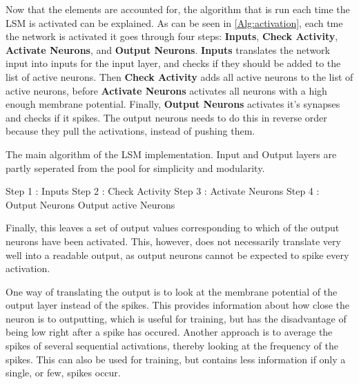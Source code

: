 Now that the elements are accounted for, the algorithm that is run each time the LSM is activated can be explained. As can be seen in \ref{Alg:activation}, each tme the network is activated it goes through four steps: \textbf{Inputs}, \textbf{Check Activity}, \textbf{Activate Neurons}, and \textbf{Output Neurons}. \textbf{Inputs} translates the network input into inputs for the input layer, and checks if they should be added to the list of active neurons. Then \textbf{Check Activity} adds all active neurons to the list of active neurons, before \textbf{Activate Neurons} activates all neurons with a high enough membrane potential. Finally, \textbf{Output Neurons} activates it's synapses and checks if it spikes. The output neurons needs to do this in reverse order because they pull the activations, instead of pushing them.

\begin{algorithm}
\caption{The main algorithm of the LSM implementation. Input and Output layers are partly seperated from the pool for simplicity and modularity.}
\label{Alg:activation}
	Step 1 : Inputs\;
	Step 2 : Check Activity\;
	Step 3 : Activate Neurons\;
	Step 4 : Output Neurons\;
	Output active Neurons\;
\end{algorithm}

Finally, this leaves a set of output values corresponding to which of the output neurons have been activated. This, however, does not necessarily translate very well into a readable output, as output neurons cannot be expected to spike every activation.

One way of translating the output is to look at the membrane potential of the output layer instead of the spikes. This provides information about how close the neuron is to outputting, which is useful for training, but has the disadvantage of being low right after a spike has occured.
Another approach is to average the spikes of several sequential activations, thereby looking at the frequency of the spikes. This can also be used for training, but contains less information if only a single, or few, spikes occur.

